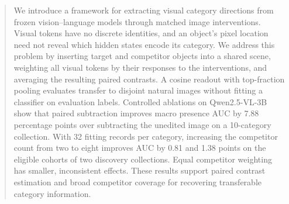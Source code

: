 \begin{abstract}
We introduce a framework for extracting visual category directions from
frozen vision--language models through matched image interventions.
Visual tokens have no discrete identities, and an object's pixel location
need not reveal which hidden states encode its category. We address this
problem by inserting target and competitor objects into a shared scene,
weighting all visual tokens by their responses to the interventions, and
averaging the resulting paired contrasts. A cosine readout with top-fraction
pooling evaluates transfer to disjoint natural images without fitting a
classifier on evaluation labels. Controlled ablations on Qwen2.5-VL-3B show
that paired subtraction improves macro presence AUC by 7.88 percentage
points over subtracting the unedited image on a 10-category collection.
With 32 fitting records per category, increasing the competitor count from
two to eight improves AUC by 0.81 and 1.38 points on the eligible cohorts
of two discovery collections. Equal competitor weighting has smaller,
inconsistent effects. These results support paired contrast estimation and
broad competitor coverage for recovering transferable category information.
\end{abstract}
